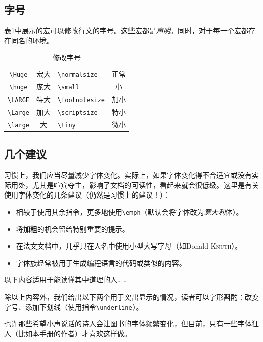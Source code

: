 \subsection{字号}

表\ref{tab:2.2}中展示的宏可以修改行文的字号。这些宏都是\emph{声明}。同时，对于每一个宏都存在同名的环境。

\begin{table}[ht]
    \centering
    \begin{tabular}{|c|c||l|c|}
\hline
\verb|\Huge| & {\Huge 宏大} & \verb|\normalsize| & {正常} \\
\verb|\huge| & {\huge 庞大} & \verb|\small| & {\small 小} \\
\verb|\LARGE| & {\LARGE 特大} & \verb|\footnotesize| & {\footnotesize 加小} \\
\verb|\Large| & {\Large 加大} & \verb|\scriptsize| & {\scriptsize 特小} \\
\verb|\large| & {\large 大} & \verb|\tiny| & {\tiny 微小} \\
\hline
    \end{tabular}
    \caption{修改字号}
    \label{tab:2.2}
\end{table}

\subsection{几个建议}

习惯上，我们应当尽量减少字体变化。实际上，如果字体变化得不合适宜或没有实际用处，尤其是喧宾夺主，影响了文档的可读性，看起来就会很低级。这里是有关使用字体变化的几条建议（仍然是习惯上的建议！）：
\begin{itemize}
    \item 相较于使用其余指令，更多地使用\verb+\emph+（默认会将字体改为\emph{意大利}体）。
    \item 将\textbf{加粗}的机会留给特别重要的提示。
    \item 在法文文档中，几乎只在人名中使用小型大写字母（如Donald \textsc{Knuth}）。
    \item {}字体族经常被用于生成编程语言的代码或类似的内容。
\end{itemize}

以下内容适用于能读懂其中道理的人……

除以上内容外，我们给出以下两个用于突出显示的情况，读者可以字形斟酌：改变字号、添加下划线（使用指令\verb|\underline|）。

\begin{origincitation}
    也许那些希望{\tiny 小声说话}的诗人会让图书的字体频繁变化，但目前，只有一些字体狂人{\tiny （比如本手册的作者）}才喜欢这样做。
\end{origincitation}


